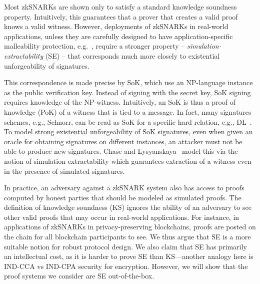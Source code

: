 Most zkSNARKs are shown only to satisfy a standard knowledge soundness
property. Intuitively, this guarantees that a prover that creates a valid proof knows
a valid witness. However, deployments of zkSNARKs in real-world applications, unless
they are carefully designed to have application-specific malleability protection,
e.g.~\cite{SP:BCGGMT14}, require a stronger property --
\emph{simulation-extractability} (SE) -- that corresponds much more
closely to existential unforgeability of signatures.

This correspondence is made precise by SoK, which use an
NP-language instance as the public verification key. Instead of signing with the secret key, SoK signing requires knowledge of the
NP-witness. Intuitively, an SoK is thus a proof of knowledge (PoK) of a witness that is tied to a message. In fact, many signatures schemes, e.g., Schnorr, can be read as SoK for a specific hard relation, e.g., DL~\cite{AC:DHLW10}. To model strong existential unforgeability of SoK signatures, even
when given an oracle for obtaining signatures on different instances, an attacker
must not be able to produce new signatures. Chase and Lysyanskaya~\cite{C:ChaLys06} model this via the
notion of simulation extractability which guarantees extraction of a witness
even in the presence of simulated signatures.

In practice, an adversary against a zkSNARK system also has access to proofs computed by honest parties that should be modeled as simulated proofs. The definition of knowledge soundness (KS) ignores the ability of an adversary
to see other valid proofs that may occur in real-world applications. For instance,
in applications of zkSNARKs in privacy-preserving blockchains, proofs are posted on
the chain for all blockchain participants to see. We thus argue that SE is a more suitable notion for robust protocol design. We also claim that SE has primarily an intellectual cost, as it is harder to prove SE than KS---another analogy here is IND-CCA vs IND-CPA security for encryption. However, we will show that the proof systems we consider are SE out-of-the-box.


